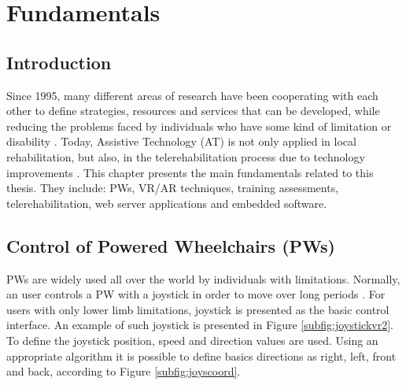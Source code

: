\chapter{Fundamentals}

\section{Introduction}

Since 1995, many different areas of research have been cooperating with each other to define strategies, resources and services that can be developed, while reducing the problems faced by individuals who have some kind of limitation or disability \cite{ludy1995}. Today, Assistive Technology (AT) is not only applied in local rehabilitation, but also, in the telerehabilitation process due to technology improvements \cite{barriga2016}. This chapter presents the main fundamentals related to this thesis. They include: PWs, VR/AR techniques, training assessments, telerehabilitation, web server applications and embedded software.

\section{Control of Powered Wheelchairs (PWs)}
\label{sec:ewheelchair}

PWs are widely used all over the world by individuals with limitations. Normally, an user controls a PW with a joystick in order to move over long periods \cite{fattouh2004}. For users with only lower limb limitations, joystick is presented as the basic control interface. An example of such joystick is presented in Figure \ref{subfig:joystickvr2}.  To define the joystick position, speed and direction values are used. Using an appropriate algorithm it is possible to define basics directions as right, left, front and back, according to Figure \ref{subfig:joyscoord}.


